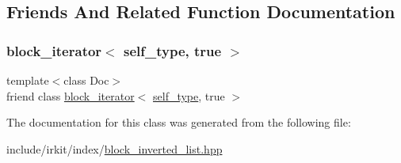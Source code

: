 \subsection{Friends And Related Function Documentation}
\mbox{\label{classirk_1_1index_1_1block__document__list__view_a9e9d706e71ebb8b3d20137fb0121c8bd}} 
\subsubsection{\texorpdfstring{block\+\_\+iterator$<$ self\+\_\+type, true $>$}{block\_iterator< self\_type, true >}}
{\footnotesize\ttfamily template$<$class Doc$>$ \\
friend class \mbox{\hyperlink{classirk_1_1index_1_1block__iterator}{block\+\_\+iterator}}$<$ \mbox{\hyperlink{classirk_1_1index_1_1block__document__list__view_a006662b07e3f2cd8f0c9709584e4f7f3}{self\+\_\+type}}, true $>$\hspace{0.3cm}{\ttfamily [friend]}}



The documentation for this class was generated from the following file\+:\begin{DoxyCompactItemize}
\item 
include/irkit/index/\mbox{\hyperlink{block__inverted__list_8hpp}{block\+\_\+inverted\+\_\+list.\+hpp}}\end{DoxyCompactItemize}
